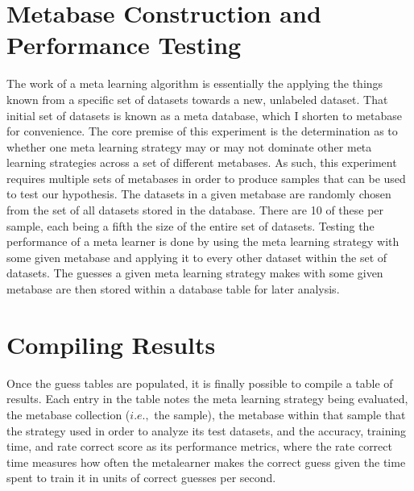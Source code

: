\section{Metabase Construction and Performance Testing}
The work of a meta learning algorithm is essentially the applying the things
known from a specific set of datasets towards a new, unlabeled dataset. That
initial set of datasets is known as a meta database, which I shorten to metabase
for convenience. The core premise of this experiment is the determination as to
whether one meta learning strategy may or may not dominate other
meta learning strategies across a set of different metabases. As such, this
experiment requires multiple sets of metabases in order to produce samples
that can be used to test our hypothesis. The datasets in a given metabase are
randomly chosen from the set of all datasets stored in the database. There
are 10 of these per sample, each being a fifth the size of the entire set of
datasets. Testing the performance of a meta learner is done by using the
meta learning strategy with some given metabase and applying it to every other
dataset within the set of datasets. The guesses a given meta learning strategy
makes with some given metabase are then stored within a database table for later
analysis.

\section{Compiling Results}
Once the guess tables are populated, it is finally possible to compile a table
of results. Each entry in the table notes the meta learning strategy being
evaluated, the metabase collection ($i.e.,$ the sample), the metabase within that
sample that the strategy used in order to analyze its test datasets, and the
accuracy, training time, and rate correct score as its performance metrics,
where the rate correct time measures how often the metalearner makes the correct
guess given the time spent to train it in units of correct guesses per second.
